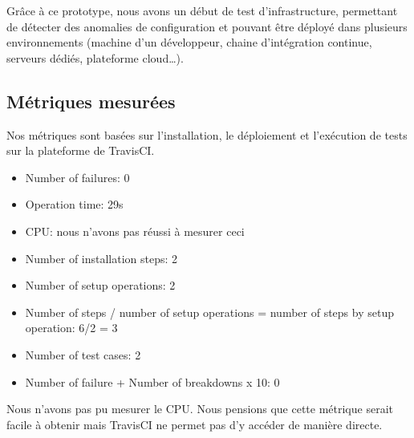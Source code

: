     Grâce à ce prototype, nous avons un début de test d'infrastructure, permettant de détecter des anomalies de configuration et pouvant être déployé dans plusieurs environnements (machine d'un développeur, chaine d'intégration continue, serveurs dédiés, plateforme cloud\dots).

\subsection{Métriques mesurées}
    Nos métriques sont basées sur l'installation, le déploiement et l'exécution de tests sur la plateforme de TravisCI.
    \begin{itemize}
        \item Number of failures: 0
        \item Operation time: 29s
        \item CPU: nous n'avons pas réussi à mesurer ceci
        \item Number of installation steps: 2
        \item Number of setup operations: 2
        \item Number of steps / number of setup operations = number of steps by setup operation: 6/2 = 3
        \item Number of test cases: 2
        \item Number of failure + Number of breakdowns x 10: 0
    \end{itemize}

    Nous n'avons pas pu mesurer le CPU. Nous pensions que cette métrique serait facile à obtenir mais TravisCI ne permet pas d'y accéder de manière directe.
